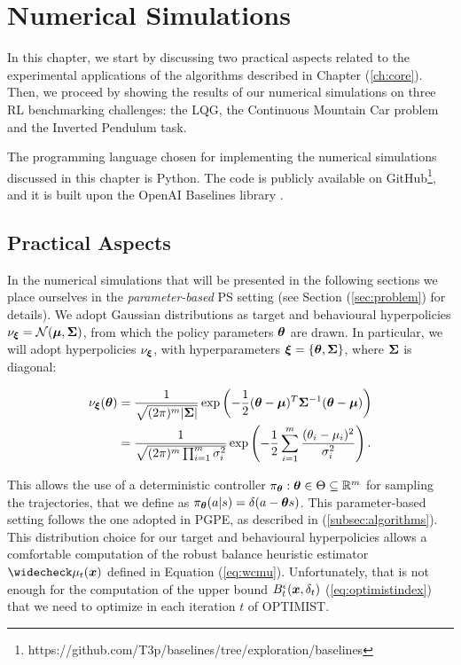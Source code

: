 
\chapter{Numerical Simulations} \label{ch:experiments}
In this chapter, we start by discussing two practical aspects related to the experimental applications of the algorithms described in Chapter (\ref{ch:core}). Then, we proceed by showing the results of our numerical simulations on three \gls{RL} benchmarking challenges: the \gls{LQG}, the Continuous Mountain Car problem and the Inverted Pendulum task.

The programming language chosen for implementing the numerical simulations discussed in this chapter is Python. The code is publicly available on GitHub\footnote{https://github.com/T3p/baselines/tree/exploration/baselines}, and it is built upon the OpenAI Baselines library \cite{baselines}.

\section{Practical Aspects} \label{sec:practical}
In the numerical simulations that will be presented in the following sections we place ourselves in the \emph{parameter-based} \gls{PS} setting (see Section (\ref{sec:problem}) for details). We adopt Gaussian distributions as target and behavioural hyperpolicies $\nu_{\boldsymbol{\xi}}= \mathcal{N}(\boldsymbol{\mu},\boldsymbol{\Sigma})$, from which the policy parameters $\boldsymbol{\theta}$ are drawn. In particular, we will adopt hyperpolicies $\nu_{\boldsymbol{\xi}}$, with hyperparameters $\boldsymbol{\xi}=\{\boldsymbol{\theta},\boldsymbol{\Sigma}\}$, where $\boldsymbol{\Sigma}$ is diagonal: 

\begin{align}
\nu_{\boldsymbol{\xi}}(\boldsymbol{\theta}) & = \frac{1}{\sqrt{(2\pi)^m |\boldsymbol{\Sigma} |}}\exp\left(
	-\frac{1}{2} (\boldsymbol{\theta} - \boldsymbol{\mu} )^T\boldsymbol{\Sigma}^{-1}(\boldsymbol{\theta} - \boldsymbol{\mu} )\right)\\
	& = \frac{1}{\sqrt{(2\pi)^m \prod_{i=1}^{m} \sigma_{i}^2}}\exp\left(
	-\frac{1}{2} \sum\limits_{i=1}^m\frac{(\theta_{i}-\mu_{i})^2}{\sigma_{i}^2}\right).
\end{align}

This allows the use of a deterministic controller $\pi_{\boldsymbol{\theta}}: \boldsymbol{\theta}\in\Theta\subseteq\mathbb{R}^m$ for sampling the trajectories, that we define as $\pi_{\boldsymbol{\theta}}(a|s)=\delta(a-\boldsymbol{\theta} s)$. This parameter-based setting follows the one adopted in \gls{PGPE}, as described in (\ref{subsec:algorithms}). \\
This distribution choice for our target and behavioural hyperpolicies allows a comfortable computation of the robust balance heuristic estimator $\wc{\mu}_t(\vx)$ defined in Equation (\ref{eq:wcmu}). Unfortunately, that is not enough for the computation of the upper bound $B_t^{\epsilon}(\boldsymbol{x},\delta_t)$ (\ref{eq:optimistindex}) that we need to optimize in each iteration $t$ of \gls{OPTIMIST}.

